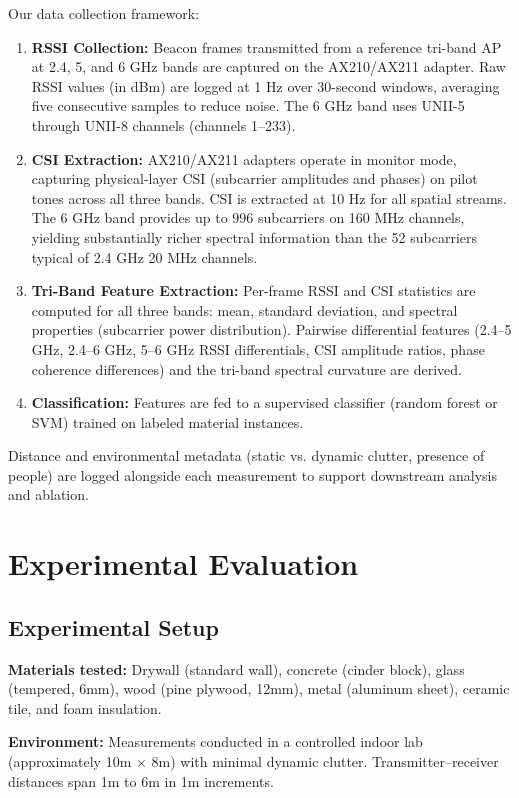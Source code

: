 \documentclass[conference]{IEEEtran}
\begin{document}
Our data collection framework:
\begin{enumerate}
    \item \textbf{RSSI Collection:} Beacon frames transmitted from a reference tri-band AP at 2.4, 5, and 6 GHz bands are captured on the AX210/AX211 adapter. Raw RSSI values (in dBm) are logged at 1 Hz over 30-second windows, averaging five consecutive samples to reduce noise. The 6 GHz band uses UNII-5 through UNII-8 channels (channels 1--233).
    \item \textbf{CSI Extraction:} AX210/AX211 adapters operate in monitor mode, capturing physical-layer CSI (subcarrier amplitudes and phases) on pilot tones across all three bands. CSI is extracted at 10 Hz for all spatial streams. The 6 GHz band provides up to 996 subcarriers on 160 MHz channels, yielding substantially richer spectral information than the 52 subcarriers typical of 2.4 GHz 20 MHz channels.
    \item \textbf{Tri-Band Feature Extraction:} Per-frame RSSI and CSI statistics are computed for all three bands: mean, standard deviation, and spectral properties (subcarrier power distribution). Pairwise differential features (2.4--5 GHz, 2.4--6 GHz, 5--6 GHz RSSI differentials, CSI amplitude ratios, phase coherence differences) and the tri-band spectral curvature are derived.
    \item \textbf{Classification:} Features are fed to a supervised classifier (random forest or SVM) trained on labeled material instances.
\end{enumerate}

Distance and environmental metadata (static vs. dynamic clutter, presence of people) are logged alongside each measurement to support downstream analysis and ablation.

\section{Experimental Evaluation}

\subsection{Experimental Setup}

\textbf{Materials tested:} Drywall (standard wall), concrete (cinder block), glass (tempered, 6mm), wood (pine plywood, 12mm), metal (aluminum sheet), ceramic tile, and foam insulation.

\textbf{Environment:} Measurements conducted in a controlled indoor lab (approximately 10m × 8m) with minimal dynamic clutter. Transmitter–receiver distances span 1m to 6m in 1m increments.
\end{document}
